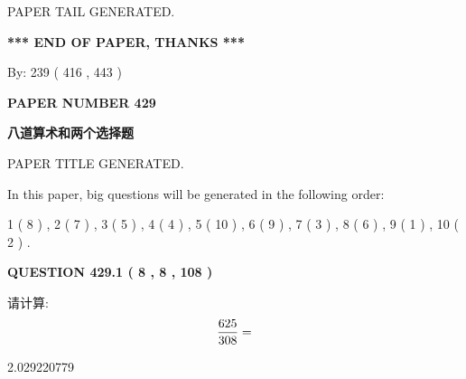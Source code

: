 \documentclass{ctexart}
\begin{document}
   
   
\vspace{2.0in} PAPER TAIL GENERATED.
   
   
   
   
\vspace{1.0in} 
{\textbf{\large{ *** END OF PAPER, THANKS *** }}} 
   
   
\hspace{1.0in} By: 
 239 ( 416 ,  443 )
   
   
   
   
\newpage 
\setcounter{page}{ 
   429001 } 
   
   
   
   
 {\textbf{ \Large{ PAPER NUMBER  429  }}}
   
   
\vspace{0.2in}
   
   
   
   
   
   
   
   
 \vspace{0.2in}
{\LARGE {\textbf{ 八道算术和两个选择题}}}
   
   
 PAPER TITLE GENERATED.
   
   
   
\vspace{0.2in}
   
In this paper, big questions will be generated in the following order: 
   
   
   1 ( 8 )
 ,
   2 ( 7 )
 ,
   3 ( 5 )
 ,
   4 ( 4 )
 ,
   5 ( 10 )
 ,
   6 ( 9 )
 ,
   7 ( 3 )
 ,
   8 ( 6 )
 ,
   9 ( 1 )
 ,
   10 ( 2 )
 .
  
\vspace{0.2in}
  
{\textbf{\Large{QUESTION
429.1 
 ( 8 , 8 , 108 )
}}}
  
  
 
请计算:
\begin{equation}
\frac { %
625 }  {  %
308} = \nonumber
\end{equation}
 
 
 
\noindent{}
 
 

2.029220779
 
 
\noindent{}
 
\end{document}
